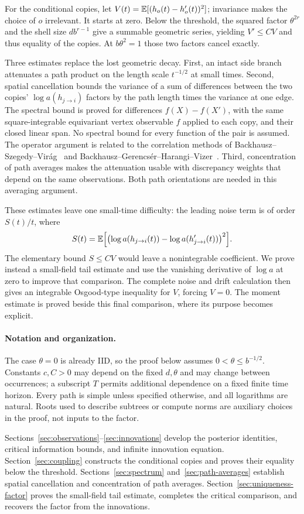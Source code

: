 For the conditional copies, let
$V(t)=\mathbb E[(h_o(t)-h'_o(t))^2]$; invariance makes the choice of $o$
irrelevant. It starts at zero. Below the threshold, the squared factor
$\theta^{2r}$ and the shell size $d b^{r-1}$ give a summable geometric
series, yielding $V'\le CV$ and thus equality of the copies.
At $b\theta^2=1$ those two factors cancel exactly.

Three estimates replace the lost geometric decay. First, an intact side
branch attenuates a path product on the length scale $t^{-1/2}$ at small
times. Second, spatial cancellation bounds the variance of a sum of
differences between the two copies' $\log a(h_{j\to i})$ factors by
the path length times the variance at one edge. The spectral
bound is proved for differences $f(X)-f(X')$, with the same
square-integrable equivariant vertex observable $f$ applied to each copy, and their closed
linear span. No spectral bound for every function of the pair is assumed.
The operator argument is related to the correlation methods of
Backhausz--Szegedy--Vir\'ag~\cite{BSV} and
Backhausz--Gerencs\'er--Harangi--Vizer~\cite{BGHV}.
Third, concentration of path averages makes the attenuation
usable with discrepancy weights that depend on the same observations.
Both path orientations are needed in this averaging argument.

These estimates leave one small-time difficulty: the leading noise
term is of order $S(t)/t$, where
\[
 S(t)=\mathbb E\Bigl[\bigl(\log a(h_{j\to i}(t))
                    -\log a(h'_{j\to i}(t))\bigr)^2\Bigr].
\]
The elementary bound $S\le CV$ would leave a nonintegrable coefficient.
We prove instead a small-field tail estimate and use the vanishing
derivative of $\log a$ at zero to improve that comparison. The complete
noise and drift calculation then gives an integrable Osgood-type
inequality for $V$, forcing $V=0$. The moment estimate is proved beside
this final comparison, where its purpose becomes explicit.

\paragraph{Notation and organization.}
The case $\theta=0$ is already IID, so the proof below assumes
$0<\theta\le b^{-1/2}$. Constants $c,C>0$ may depend on the fixed
$d,\theta$ and may change between occurrences; a subscript $T$ permits
additional dependence on a fixed finite time horizon. Every path is
simple unless specified otherwise, and all logarithms are natural.
Roots used to describe subtrees or compute norms are auxiliary choices
in the proof, not inputs to the factor.

Sections~\ref{sec:observations}--\ref{sec:innovations} develop the
posterior identities, critical information bounds, and infinite
innovation equation. Section~\ref{sec:coupling} constructs the conditional
copies and proves their equality below the threshold.
Sections~\ref{sec:spectrum} and~\ref{sec:path-averages} establish spatial
cancellation and concentration of path averages.
Section~\ref{sec:uniqueness-factor} proves the small-field tail estimate,
completes the critical comparison, and recovers the factor from the
innovations.
